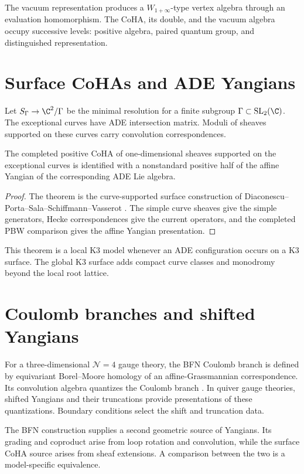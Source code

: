 The vacuum representation produces a $W_{1+\infty}$-type vertex algebra through an evaluation homomorphism. The CoHA, its double, and the vacuum algebra occupy successive levels: positive algebra, paired quantum group, and distinguished representation.

\chapter{Surface CoHAs and ADE Yangians}
Let $S_\Gamma\to\C^2/\Gamma$ be the minimal resolution for a finite subgroup $\Gamma\subset\operatorname{SL}_2(\C)$. The exceptional curves have ADE intersection matrix. Moduli of sheaves supported on these curves carry convolution correspondences.

\begin{theorem}
The completed positive CoHA of one-dimensional sheaves supported on the exceptional curves is identified with a nonstandard positive half of the affine Yangian of the corresponding ADE Lie algebra.
\end{theorem}
\begin{proof}
The theorem is the curve-supported surface construction of Diaconescu--Porta--Sala--Schiffmann--Vasserot \cite{DPPSSV}. The simple curve sheaves give the simple generators, Hecke correspondences give the current operators, and the completed PBW comparison gives the affine Yangian presentation.
\end{proof}

This theorem is a local K3 model whenever an ADE configuration occurs on a K3 surface. The global K3 surface adds compact curve classes and monodromy beyond the local root lattice.

\chapter{Coulomb branches and shifted Yangians}
For a three-dimensional $\mathcal N=4$ gauge theory, the BFN Coulomb branch is defined by equivariant Borel--Moore homology of an affine-Grassmannian correspondence. Its convolution algebra quantizes the Coulomb branch \cite{BFN}. In quiver gauge theories, shifted Yangians and their truncations provide presentations of these quantizations. Boundary conditions select the shift and truncation data.

The BFN construction supplies a second geometric source of Yangians. Its grading and coproduct arise from loop rotation and convolution, while the surface CoHA source arises from sheaf extensions. A comparison between the two is a model-specific equivalence.

